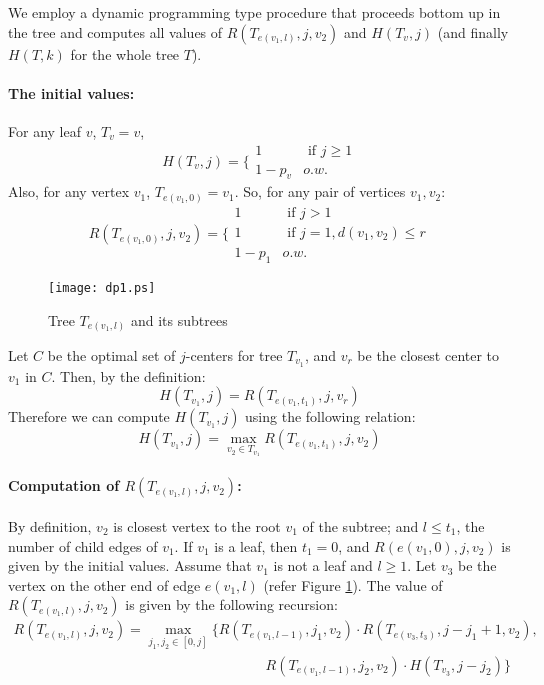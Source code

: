 \documentclass[11pt,onecolumn]{article}
\begin{document}
We employ a dynamic programming type procedure that proceeds bottom up in the tree and computes all values of $R(T_{e(v_1,l)}, j, v_2)$ and $H(T_v, j)$ (and finally $H(T,k)$ for the whole tree $T$). 
\paragraph{The initial values:} For any leaf $v$, $T_v =v$,
$$H(T_{v},j) = \Bigg\{\begin{array}{cc} 
			1 & \mbox{ if } j\ge 1 \\
			1-p_v & o.w.	
			\end{array}
$$
Also, for any vertex $v_1$, $T_{e(v_1,0)}=v_1$. So, for any pair of vertices $v_1,v_2$:
$$R(T_{e(v_1,0)},j,v_2) = \displaystyle\Bigg\{\begin{array}{ll} 
			1 & \mbox{ if } j > 1\\
			1 & \mbox{ if } j = 1, d(v_1,v_2) \le r\\
			1-p_1 & o.w. 
			\end{array}
$$

\begin{figure}[htbp]
\begin{center}
\texttt{[image: dp1.ps]}
\caption{Tree $T_{e(v_1,l)}$ and its subtrees}
\label{fig1}
\end{center}
\end{figure}

Let $C$ be the optimal set of $j$-centers for tree $T_{v_1}$, and $v_r$ be the closest center to $v_1$ in $C$. Then, by the definition: 
$$H(T_{v_1},j) =R(T_{e(v_1, t_1)}, j, v_r)$$
Therefore we can compute $H(T_{v_1},j)$ using the following relation:
$$H(T_{v_1},j) = \max_{v_2 \in T_{v_1}} {R(T_{e(v_1,t_1)}, j, v_2)}$$

\paragraph{Computation of $R(T_{e(v_1,l)},j, v_2)$:}
By definition, $v_2$ is closest vertex to the root $v_1$ of the subtree; and $l\le t_1$, the number of child edges of $v_1$. If $v_1$ is a leaf, then $t_1=0$, and $R(e(v_1,0),j,v_2)$ is given by the initial values. 
Assume that $v_1$ is not a leaf and $l \ge 1$. Let $v_3$ be the vertex on the other end of edge $e(v_1,l)$ (refer Figure \ref{fig1}). The value of $R(T_{e(v_1,l)},j, v_2)$ is given by the following recursion:
$$
\begin{array}{l}
R(T_{e(v_1,l)},j,v_2)= \max_{j_1, j_2 \in [0,j]} \{ R(T_{e(v_1,l-1)},j_1,v_2) \cdot R(T_{e(v_3,t_3)},j-j_1+1,v_2),\\
\hspace{3in} R(T_{e(v_1,l-1)},j_2,v_2) \cdot H(T_{v_3},j-j_2)\}
\end{array}
$$
\end{document}
